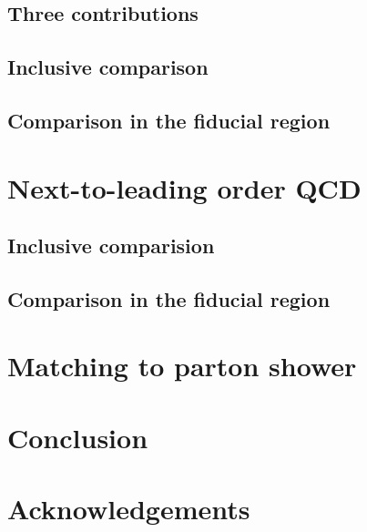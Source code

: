 \documentclass[twocolumn,epjc3]{svjour3} %
\begin{document}
    \subsection{Three contributions}
        \label{subsec:contributions}
        
    \subsection{Inclusive comparison}
        \label{subsec:LOinclusive}
        
    \subsection{Comparison in the fiducial region}
        \label{subsec:LOfiducial}
        
        

\section{Next-to-leading order QCD}
    \label{sec:NLO}
    \subsection{Inclusive comparision}
        \label{subsec:NLOinclusive}
        
    \subsection{Comparison in the fiducial region}
        
        

\section{Matching to parton shower}
    \label{sec:matching}
    


\section{Conclusion}
\label{sec:conclusion}




\section*{Acknowledgements}



% 




\end{document}
